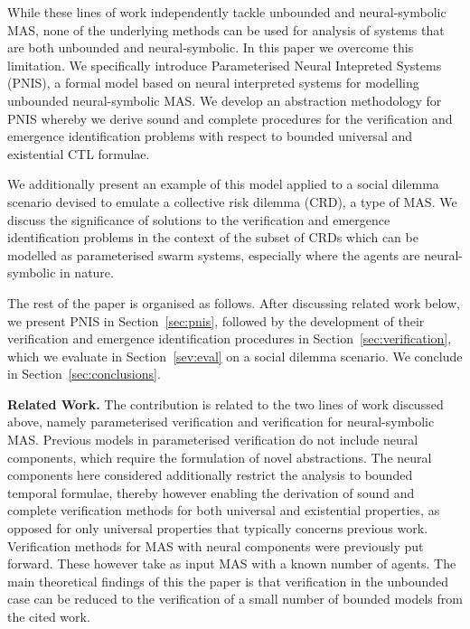 While these lines of work independently tackle unbounded and neural-symbolic
MAS, none of the underlying methods can be used for analysis of systems that are
both unbounded and neural-symbolic.  In this paper we overcome this limitation.
We specifically introduce Parameterised Neural Intepreted Systems (PNIS), a
formal model based on neural interpreted systems for modelling unbounded
neural-symbolic MAS.  We develop an abstraction methodology for PNIS whereby we
derive sound and complete procedures for the verification and emergence
identification problems with respect to  bounded universal and existential CTL
formulae.

We additionally present an example of this model applied to a social
dilemma scenario devised to emulate a collective risk dilemma (CRD), a type of
MAS. We discuss the significance of solutions to the verification and emergence
identification problems in the context of the subset of CRDs which can be
modelled as parameterised swarm systems, especially where the agents are
neural-symbolic in nature.


The rest of the paper is organised as follows. After discussing related work
below, we present PNIS in Section~\ref{sec:pnis}, followed by the development of
their verification and emergence identification procedures in
Section~\ref{sec:verification}, which we evaluate in Section~\ref{sev:eval}  on
a social dilemma scenario. We conclude in Section~\ref{sec:conclusions}.


{\bf Related Work.}  The contribution is related to the two lines of work
discussed above, namely parameterised verification and verification for
neural-symbolic MAS. Previous models in parameterised verification do not
include neural components, which require the formulation of novel abstractions.
The neural components here considered additionally restrict the analysis to
bounded temporal formulae, thereby however enabling the derivation of sound and
complete verification methods for both universal and existential properties, as
opposed for only universal properties that typically concerns previous work.
Verification methods for MAS with neural components were previously put forward.
These however take as input MAS with a known number of agents. The main
theoretical findings of this  the paper is that verification in the unbounded
case can be reduced to the verification of a small number of bounded models from
the cited work.


